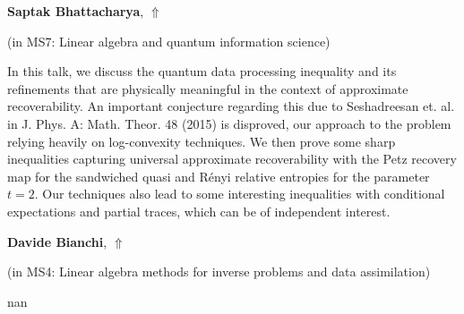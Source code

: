 \documentclass[ILAS2025-program.tex]{subfiles}
\begin{document}
\hypertarget{down0207}{}\begin{ilasabstract}
    
\textbf{Saptak Bhattacharya},  \hfill \hyperlink{up0207}{$\Uparrow$}
    
    
(in {\color{mstitle}MS7: Linear algebra and quantum information science})
        
\mtskip
    In this talk, we discuss the quantum data processing inequality and its refinements that are physically meaningful in the context of approximate recoverability. An important conjecture regarding this due to Seshadreesan et. al. in J. Phys. A: Math. Theor. 48 (2015) is disproved, our approach to the problem relying heavily on log-convexity techniques. We then prove some sharp inequalities capturing universal approximate recoverability with the Petz recovery map for the sandwiched quasi and R\'enyi relative entropies for the parameter $t =2$. Our techniques also lead to some interesting inequalities with conditional expectations and partial traces, which can be of independent interest.

\end{ilasabstract}
    

\hypertarget{down0201}{}\begin{ilasabstract}
    
\textbf{Davide Bianchi},  \hfill \hyperlink{up0201}{$\Uparrow$}
    
    
(in {\color{mstitle}MS4: Linear algebra methods for inverse problems and data assimilation})
        
\mtskip
    nan
\end{ilasabstract}
    
\end{document}
